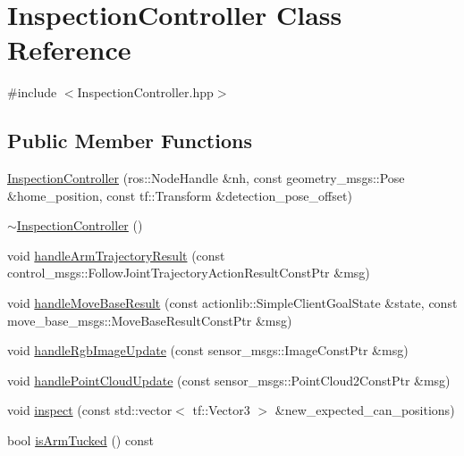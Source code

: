 \hypertarget{classInspectionController}{}\section{Inspection\+Controller Class Reference}
\label{classInspectionController}


{\ttfamily \#include $<$Inspection\+Controller.\+hpp$>$}

\subsection*{Public Member Functions}
\begin{DoxyCompactItemize}
\item 
\hyperlink{classInspectionController_a80159b0d7e354ed3d2a11a965fecc76b}{Inspection\+Controller} (ros\+::\+Node\+Handle \&nh, const geometry\+\_\+msgs\+::\+Pose \&home\+\_\+position, const tf\+::\+Transform \&detection\+\_\+pose\+\_\+offset)
\item 
\hyperlink{classInspectionController_a5090f9c7c12f1f392c931142f61dc5f5}{$\sim$\+Inspection\+Controller} ()
\item 
void \hyperlink{classInspectionController_ac797dd6e2b73f69faeea79c68040ff80}{handle\+Arm\+Trajectory\+Result} (const control\+\_\+msgs\+::\+Follow\+Joint\+Trajectory\+Action\+Result\+Const\+Ptr \&msg)
\item 
void \hyperlink{classInspectionController_ae4eedafe47b2ef66b4e2b94030d1a5c7}{handle\+Move\+Base\+Result} (const actionlib\+::\+Simple\+Client\+Goal\+State \&state, const move\+\_\+base\+\_\+msgs\+::\+Move\+Base\+Result\+Const\+Ptr \&msg)
\item 
void \hyperlink{classInspectionController_af63cab2f6a58cea872a5114fc12a184f}{handle\+Rgb\+Image\+Update} (const sensor\+\_\+msgs\+::\+Image\+Const\+Ptr \&msg)
\item 
void \hyperlink{classInspectionController_a0be5ef625b1ef85a9bbc3aed29436d31}{handle\+Point\+Cloud\+Update} (const sensor\+\_\+msgs\+::\+Point\+Cloud2\+Const\+Ptr \&msg)
\item 
void \hyperlink{classInspectionController_a06e3e7749ede8c15dfff60ebbd5c5d79}{inspect} (const std\+::vector$<$ tf\+::\+Vector3 $>$ \&new\+\_\+expected\+\_\+can\+\_\+positions)
\item 
bool \hyperlink{classInspectionController_a6be39aa4b5e8b6ea62b1b90285c7ff64}{is\+Arm\+Tucked} () const
\end{DoxyCompactItemize}


